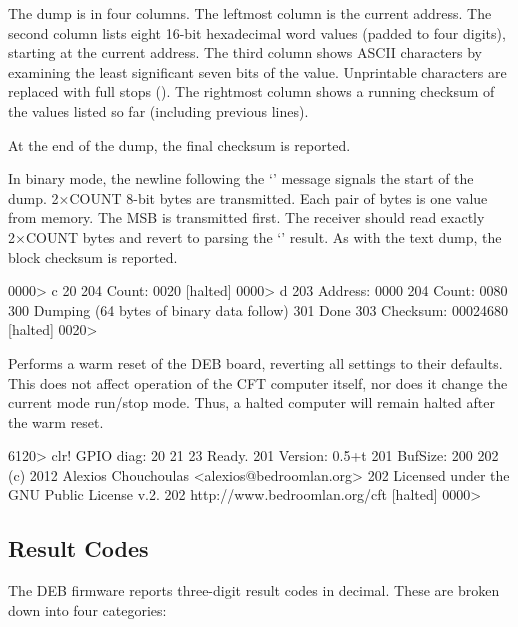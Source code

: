 \begin{description}
The dump is in four columns. The leftmost column is the current
address. The second column lists eight 16-bit hexadecimal word values
(padded to four digits), starting at the current address. The third
column shows ASCII characters by examining the least significant seven
bits of the value. Unprintable characters are replaced with full stops
(). The rightmost column shows a running checksum of the values
listed so far (including previous lines).

At the end of the dump, the final checksum is reported.

In binary mode, the newline following the ‘’ message
signals the start of the dump. 2×COUNT 8-bit bytes are
transmitted. Each pair of bytes is one value from memory. The
\gls{MSB} is transmitted first. The receiver should read exactly
2×COUNT bytes and revert to parsing the ‘’ result. As
with the text dump, the block checksum is reported.

\begin{debcode}
[halted] 0000> c 20
204 Count: 0020
[halted] 0000> d
203 Address: 0000
204 Count: 0080
300 Dumping
(64 bytes of binary data follow)
301 Done
303 Checksum: 00024680
[halted] 0020>
\end{debcode}



\item{\bfseries{}} Performs a warm reset of the \gls{DEB} board,
  reverting all settings to their defaults. This does not affect
  operation of the CFT computer itself, nor does it change the current
  mode run/stop mode. Thus, a halted computer will remain halted after
  the warm reset.

\begin{debcode}
[halted] 6120> clr!
GPIO diag: 20 21 23 Ready.
201 Version: 0.5+t
201 BufSize: 200
202 (c) 2012 Alexios Chouchoulas <alexios@bedroomlan.org>
202 Licensed under the GNU Public License v.2.
202 http://www.bedroomlan.org/cft
[halted] 0000>
\end{debcode}

\end{description}

\subsection{Result Codes}

The \gls{DEB} firmware reports three-digit result codes in
decimal. These are broken down into four categories:

